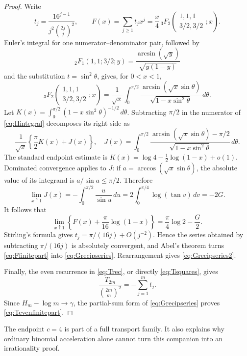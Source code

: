 \documentclass[11pt]{article}
\theoremstyle{definition}
\theoremstyle{remark}
\begin{document}
\begin{proof}
Write
\[
 t_j=\frac{16^{j-1}}{j^2\binom{2j}{j}^2},\qquad
 F(x)=\sum_{j\ge1}t_jx^j
 =\frac{x}{4}\,{}_3F_2\!\left(\begin{matrix}1,1,1\\3/2,3/2\end{matrix};x\right).
\]
Euler's integral for one numerator--denominator pair, followed by
\[
 {}_2F_1(1,1;3/2;y)=\frac{\arcsin(\sqrt y)}{\sqrt{y(1-y)}}
\]
and the substitution $t=\sin^2\theta$, gives, for $0<x<1$,
\begin{equation}\label{eq:Hintegral}
 {}_3F_2\!\left(\begin{matrix}1,1,1\\3/2,3/2\end{matrix};x\right)
 =\frac1{\sqrt x}\int_0^{\pi/2}
 \frac{\arcsin(\sqrt x\sin\theta)}
      {\sqrt{1-x\sin^2\theta}}\,d\theta.
\end{equation}
Let $K(x)=\int_0^{\pi/2}(1-x\sin^2\theta)^{-1/2}\,d\theta$.  Subtracting
$\pi/2$ in the numerator of \eqref{eq:Hintegral} decomposes its right side as
\[
 \frac1{\sqrt x}\left\{\frac\pi2K(x)+J(x)\right\},
 \quad
 J(x)=\int_0^{\pi/2}
 \frac{\arcsin(\sqrt x\sin\theta)-\pi/2}
      {\sqrt{1-x\sin^2\theta}}\,d\theta.
\]
The standard endpoint estimate is
$K(x)=\log4-\tfrac12\log(1-x)+o(1)$.  Dominated convergence applies to $J$:
if $a=\arccos(\sqrt x\sin\theta)$, the absolute value of its integrand is
$a/\sin a\le\pi/2$.  Therefore
\[
 \lim_{x\uparrow1}J(x)
 =-\int_0^{\pi/2}\frac{u}{\sin u}\,du
 =2\int_0^{\pi/4}\log(\tan v)\,dv=-2G.
\]
It follows that
\begin{equation}\label{eq:Ffinitepart}
 \lim_{x\uparrow1}\left\{F(x)+\frac\pi{16}\log(1-x)\right\}
 =\frac\pi4\log2-\frac G2.
\end{equation}
Stirling's formula gives $t_j=\pi/(16j)+O(j^{-2})$.  Hence the series obtained by
subtracting $\pi/(16j)$ is absolutely convergent, and Abel's theorem turns
\eqref{eq:Ffinitepart} into \eqref{eq:Grecipseries}.  Rearrangement gives
\eqref{eq:Grecipseries2}.

Finally, the even recurrence in \eqref{eq:Trec}, or directly
\eqref{eq:Tsquares}, gives
\[
 \frac{T_{2m}}{\binom{2m}{m}^2}=-\sum_{j=1}^m t_j.
\]
Since $H_m-\log m\to\gamma$, the partial-sum form of
\eqref{eq:Grecipseries} proves \eqref{eq:Tevenfinitepart}.
\end{proof}

The endpoint $c=4$ is part of a full transport family.  It also explains why ordinary
binomial acceleration alone cannot turn this companion into an irrationality proof.
\end{document}
